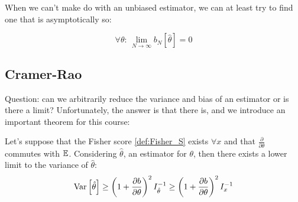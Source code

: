
When we can't make do with an unbiased estimator, we can at least try to find one that is asymptotically so:

	\[
	\forall \theta:\, \lim_{N\to\infty}b_N\left[\hat\theta\right]=0
	\]
	

\subsection{Cramer-Rao}
\label{subsubsec:CR}

Question: can we arbitrarily reduce the variance and bias of an estimator or is there a limit? Unfortunately, the answer is that there is, and we introduce an important theorem for this course:

\begin{theorem}
	Let's suppose that the Fisher score \ref{def:Fisher_S} exists $\forall x$ and that $\frac{\partial}{\partial\theta}$ commutes with $\mathbb{E}$. Considering $\hat\theta$, an estimator for $\theta$, then there exists a lower limit to the variance of $\hat\theta$:
	\[
	\operatorname{Var}\left[\hat\theta\right]\geq \left(1+\frac{\partial b}{\partial\theta}\right)^2 I_{\hat\theta}^{-1} \geq \left(1+\frac{\partial b}{\partial\theta}\right)^2 I_{x}^{-1}
	\]
\label{def:cramer-rao}
\end{theorem}

